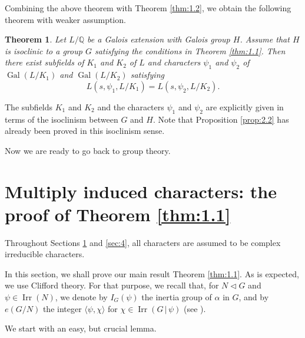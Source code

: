 \documentclass[a4paper,12pt]{article}
\newcommand{\field}[1]{\mathbb{#1}}
\newcommand{\Q}{\field{Q}}
\newtheorem{theorem}{Theorem}[section]
\theoremstyle{definition}
\theoremstyle{remark}
\DeclareMathOperator{\gal}{Gal}
\DeclareMathOperator{\irr}{Irr}
\numberwithin{equation}{section}
\begin{document}
Combining the above theorem with Theorem \ref{thm:1.2}, we obtain the following theorem with weaker assumption.

\begin{theorem} \label{thm:2.4}
    Let $L/\Q $ be a Galois extension with Galois group $H $.
    Assume that $H$ is isoclinic to a group $G$ satisfying the conditions in Theorem \ref{thm:1.1}. 
    Then there exist subfields of $K_1$ and $K_2$  of $L$ and characters $\psi_1$ and $\psi_2$ of 
    $\gal (L/K_1) $  and $\gal (L/K_2) $ satisfying 
    \[ L (s, \psi_1, L/K_1) = L (s, \psi_2, L/K_2 ). \]
\end{theorem}

The subfields $K_1$ and $K_2$ and the characters $\psi_1$ and $\psi_2$ are explicitly given in terms of 
the isoclinism between $G$ and $H$.
Note that Proposition \ref{prop:2.2} has already been proved in this isoclinism sense.

Now we are ready to go back to group theory.

\section{Multiply induced characters: the proof of Theorem \ref{thm:1.1}} \label{sec:3}
Throughout Sections \ref{sec:3} and \ref{sec:4}, all characters are assumed to be complex irreducible characters.

In this section, we shall prove our main result Theorem \ref{thm:1.1}.
As is expected, we use Clifford theory. For that purpose, we recall that, for $N \triangleleft G $ and $\psi \in \irr (N)$,
we denote by $I_G (\psi) $ the inertia group of $\alpha $ in $G$, and by $e(G/N)$ the integer $ \langle \psi , \chi \rangle $ 
for $\chi \in \irr (G \,|\, \psi)$ (see \cite[(6.2) Theorem]{MR0460423}).

We start with an easy, but crucial lemma.
\end{document}
